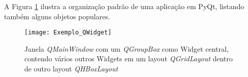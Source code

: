 A Figura \ref{img_exemplo_qwidget} ilustra a organização padrão de uma aplicação em PyQt, listando também alguns objetos populares.

\begin{figure}[hbt]
\centering
\texttt{[image: Exemplo\_QWidget]}
\caption[Fonte: https://doc.qt.io/qt-5/qwidget.html]{Janela \emph{QMainWindow} com um \emph{QGroupBox} como Widget central, contendo vários outros Widgets em um layout \emph{QGridLayout} dentro de outro layout \emph{QHBoxLayout}}
\label{img_exemplo_qwidget}
\end{figure}
